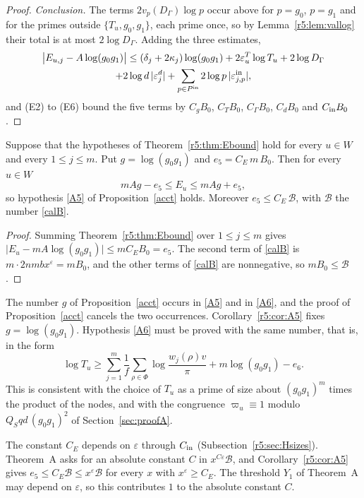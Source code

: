\begin{proof}
\emph{Conclusion.} The terms $2v_p(D_\Gamma)\log p$ occur above for $p=g_0$, $p=g_1$ and for the primes outside $\{T_u,g_0,g_1\}$, each prime once, so by Lemma~\ref{r5:lem:vallog} their total is at most $2\log D_\Gamma$. Adding the three estimates,
\begin{multline*}
\big\lvert E_{u,j}-A\log(g_0g_1)\big\rvert\le(\delta_j+2\kappa_j)\log(g_0g_1)+2\varepsilon^T_u\log T_u+2\log D_\Gamma\\
+2\log d\,\lvert\varepsilon^d_j\rvert+\sum_{p\in P^{\rm in}}2\log p\,\lvert\varepsilon^{\rm in}_{j,p}\rvert,
\end{multline*}
and (E2) to (E6) bound the five terms by $C_gB_0$, $C_TB_0$, $C_\Gamma B_0$, $C_dB_0$ and $C_{\rm in}B_0$.
\end{proof}

\begin{corollary}\label{r5:cor:A5}
Suppose that the hypotheses of Theorem~\ref{r5:thm:Ebound} hold for every $u\in W$ and every $1\le j\le m$. Put $g=\log(g_0g_1)$ and $e_5=C_E\,m\,B_0$. Then for every $u\in W$
\[
mAg-e_5\le E_u\le mAg+e_5 ,
\]
so hypothesis \eqref{A5} of Proposition~\ref{acct} holds. Moreover $e_5\le C_E\,\mathcal B$, with $\mathcal B$ the number \eqref{calB}.
\end{corollary}

\begin{proof}
Summing Theorem~\ref{r5:thm:Ebound} over $1\le j\le m$ gives $\lvert E_u-mA\log(g_0g_1)\rvert\le mC_EB_0=e_5$. The second term of \eqref{calB} is $m\cdot2nmbx^\varepsilon=mB_0$, and the other terms of \eqref{calB} are nonnegative, so $mB_0\le\mathcal B$.
\end{proof}

\begin{remark}\label{r5:rem:gcancel}
The number $g$ of Proposition~\ref{acct} occurs in \eqref{A5} and in \eqref{A6}, and the proof of Proposition~\ref{acct} cancels the two occurrences. Corollary~\ref{r5:cor:A5} fixes $g=\log(g_0g_1)$. Hypothesis \eqref{A6} must be proved with the same number, that is, in the form
\[
\log T_u\ge\sum_{j=1}^m\frac1f\sum_{\rho\in\Phi}\log\frac{w_j(\rho)v}\pi+m\log(g_0g_1)-e_6 .
\]
This is consistent with the choice of $T_u$ as a prime of size about $(g_0g_1)^m$ times the product of the nodes, and with the congruence $\varpi_u\equiv1$ modulo $Q_Sqd\,(g_0g_1)^2$ of Section~\ref{sec:proofA}.
\end{remark}

\begin{remark}\label{r5:rem:Cuniform}
The constant $C_E$ depends on $\varepsilon$ through $C_{\rm in}$ (Subsection~\ref{r5:sec:Hsizes}). Theorem~A asks for an absolute constant $C$ in $x^{C\varepsilon}\mathcal B$, and Corollary~\ref{r5:cor:A5} gives $e_5\le C_E\mathcal B\le x^{\varepsilon}\mathcal B$ for every $x$ with $x^\varepsilon\ge C_E$. The threshold $Y_1$ of Theorem~A may depend on $\varepsilon$, so this contributes $1$ to the absolute constant $C$.
\end{remark}

